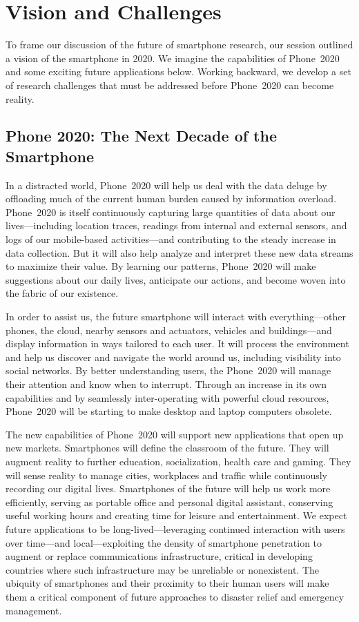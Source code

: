\section{Vision and Challenges}

To frame our discussion of the future of smartphone research, our session
outlined a vision of the smartphone in 2020. We imagine the capabilities of
Phone~2020 and some exciting future applications below. Working backward, we
develop a set of research challenges that must be addressed before Phone~2020
can become reality.

\subsection{Phone 2020: The Next Decade of the Smartphone}

In a distracted world, Phone~2020 will help us deal with the data deluge by
offloading much of the current human burden caused by information overload.
Phone~2020 is itself continuously capturing large quantities of data about
our lives---including location traces, readings from internal and external
sensors, and logs of our mobile-based activities---and contributing to the
steady increase in data collection. But it will also help analyze and
interpret these new data streams to maximize their value. By learning our
patterns, Phone~2020 will make suggestions about our daily lives, anticipate
our actions, and become woven into the fabric of our existence.
 
In order to assist us, the future smartphone will interact with
everything---other phones, the cloud, nearby sensors and actuators, vehicles
and buildings---and display information in ways tailored to each user. It
will process the environment and help us discover and navigate the world
around us, including visibility into social networks. By better understanding
users, the Phone~2020 will manage their attention and know when to interrupt.
Through an increase in its own capabilities and by seamlessly inter-operating
with powerful cloud resources, Phone~2020 will be starting to make desktop
and laptop computers obsolete.
 
The new capabilities of Phone~2020 will support new applications that open up
new markets. Smartphones will define the classroom of the future. They will
augment reality to further education, socialization, health care and gaming.
They will sense reality to manage cities, workplaces and traffic while
continuously recording our digital lives. Smartphones of the future will help
us work more efficiently, serving as portable office and personal digital
assistant, conserving useful working hours and creating time for leisure and
entertainment. We expect future applications to be long-lived---leveraging
continued interaction with users over time---and local---exploiting the
density of smartphone penetration to augment or replace communications
infrastructure, critical in developing countries where such infrastructure
may be unreliable or nonexistent. The ubiquity of smartphones and their
proximity to their human users will make them a critical component of future
approaches to disaster relief and emergency management.
 
